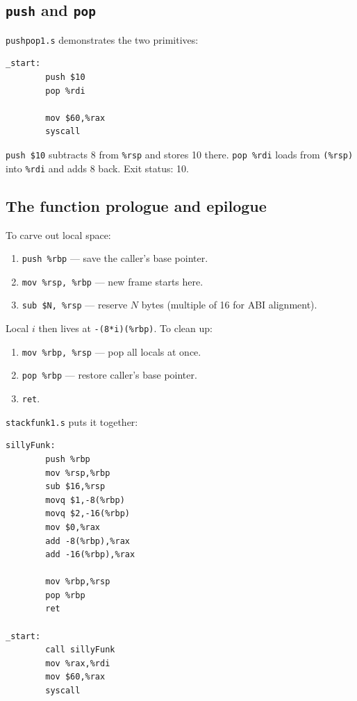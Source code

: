 \documentclass[11pt]{article}
\begin{document}
\subsection*{\texttt{push} and \texttt{pop}}

\texttt{pushpop1.s} demonstrates the two primitives:

\begin{lstlisting}
_start:
        push $10
        pop %rdi

        mov $60,%rax
        syscall
\end{lstlisting}

\texttt{push \$10} subtracts 8 from \texttt{\%rsp} and stores 10
there. \texttt{pop \%rdi} loads from \texttt{(\%rsp)} into
\texttt{\%rdi} and adds 8 back. Exit status: 10.

\subsection*{The function prologue and epilogue}

To carve out local space:
\begin{enumerate}
  \item \texttt{push \%rbp} --- save the caller's base pointer.
  \item \texttt{mov \%rsp, \%rbp} --- new frame starts here.
  \item \texttt{sub \$N, \%rsp} --- reserve $N$ bytes (multiple of
    16 for ABI alignment).
\end{enumerate}
Local $i$ then lives at \texttt{-(8*i)(\%rbp)}. To clean up:
\begin{enumerate}
  \item \texttt{mov \%rbp, \%rsp} --- pop all locals at once.
  \item \texttt{pop \%rbp} --- restore caller's base pointer.
  \item \texttt{ret}.
\end{enumerate}

\texttt{stackfunk1.s} puts it together:

\begin{lstlisting}
sillyFunk:
        push %rbp
        mov %rsp,%rbp
        sub $16,%rsp
        movq $1,-8(%rbp)
        movq $2,-16(%rbp)
        mov $0,%rax
        add -8(%rbp),%rax
        add -16(%rbp),%rax

        mov %rbp,%rsp
        pop %rbp
        ret

_start:
        call sillyFunk
        mov %rax,%rdi
        mov $60,%rax
        syscall
\end{lstlisting}
\end{document}
